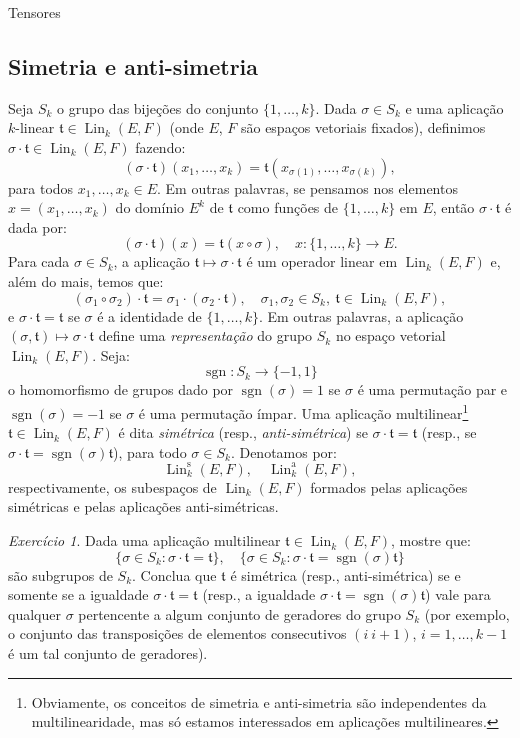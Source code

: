\documentclass[oneside,11pt]{amsart}
\DeclareMathOperator{\Lin}{Lin}
\DeclareMathOperator{\sgn}{sgn}
\theoremstyle{remark}\newtheorem{exercise}{Exercício}[section]
\theoremstyle{plain}\newtheorem{teo}{Teorema}[section]
\theoremstyle{plain}\newtheorem{lem}[teo]{Lema}
\theoremstyle{plain}\newtheorem{prop}[teo]{Proposição}
\theoremstyle{definition}\newtheorem{defin}[teo]{Definição}
\theoremstyle{remark}\newtheorem{rem}[teo]{Observação}
\theoremstyle{definition}\newtheorem{example}[teo]{Exemplo}
\numberwithin{equation}{section}
\begin{document}
\begin{section}{Tensores}
\subsection{Simetria e anti-simetria}\label{sub:tensorsimetria}
Seja $S_k$ o grupo das bijeções do conjunto $\{1,\ldots,k\}$. Dada $\sigma\in S_k$ e uma aplicação $k$-linear $\mathfrak t\in\Lin_k(E,F)$ (onde $E$, $F$
são espaços vetoriais fixados), definimos $\sigma\cdot\mathfrak t\in\Lin_k(E,F)$ fazendo:
\[(\sigma\cdot\mathfrak t)(x_1,\ldots,x_k)=\mathfrak t(x_{\sigma(1)},\ldots,x_{\sigma(k)}),\]
para todos $x_1,\ldots,x_k\in E$. Em outras palavras, se pensamos nos elementos $x=(x_1,\ldots,x_k)$ do domínio $E^k$ de $\mathfrak t$ como
funções de $\{1,\ldots,k\}$ em $E$, então $\sigma\cdot\mathfrak t$ é dada por:
\[(\sigma\cdot\mathfrak t)(x)=\mathfrak t(x\circ\sigma),\quad x:\{1,\ldots,k\}\to E.\]
Para cada $\sigma\in S_k$, a aplicação $\mathfrak t\mapsto\sigma\cdot\mathfrak t$ é um operador linear em $\Lin_k(E,F)$ e, além do mais, temos que:
\[(\sigma_1\circ\sigma_2)\cdot\mathfrak t=\sigma_1\cdot(\sigma_2\cdot\mathfrak t),\quad\sigma_1,\sigma_2\in S_k,\ \mathfrak t\in\Lin_k(E,F),\]
e $\sigma\cdot\mathfrak t=\mathfrak t$ se $\sigma$ é a identidade de $\{1,\ldots,k\}$. Em outras palavras, a aplicação
$(\sigma,\mathfrak t)\mapsto\sigma\cdot\mathfrak t$ define uma {\em representação\/} do grupo $S_k$ no espaço vetorial $\Lin_k(E,F)$.
Seja:
\[\sgn:S_k\longrightarrow\{-1,1\}\]
o homomorfismo de grupos dado por $\sgn(\sigma)=1$ se $\sigma$ é uma permutação par e $\sgn(\sigma)=-1$ se $\sigma$ é uma permutação ímpar.
Uma aplicação multilinear\footnote{%
Obviamente, os conceitos de simetria e anti-simetria são independentes da multilinearidade, mas só estamos interessados em aplicações multilineares.}
$\mathfrak t\in\Lin_k(E,F)$ é dita {\em simétrica\/} (resp., {\em anti-simétrica}) se $\sigma\cdot\mathfrak t=\mathfrak t$
(resp., se $\sigma\cdot\mathfrak t=\sgn(\sigma)\mathfrak t$), para todo $\sigma\in S_k$. Denotamos por:
\[\Lin^{\mathrm s}_k(E,F),\quad\Lin^{\mathrm a}_k(E,F),\]
respectivamente, os subespaços de $\Lin_k(E,F)$ formados pelas aplicações si\-mé\-tri\-cas e pelas aplicações anti-simétricas.

\begin{exercise}\label{exe:bastatrocas}
Dada uma aplicação multilinear $\mathfrak t\in\Lin_k(E,F)$, mostre que:
\[\big\{\sigma\in S_k:\sigma\cdot\mathfrak t=\mathfrak t\big\},\quad\big\{\sigma\in S_k:\sigma\cdot\mathfrak t=\sgn(\sigma)\mathfrak t\big\}\]
são subgrupos de $S_k$. Conclua que $\mathfrak t$ é simétrica (resp., anti-simétrica) se e somente se a igualdade $\sigma\cdot\mathfrak t=\mathfrak t$
(resp., a igualdade $\sigma\cdot\mathfrak t=\sgn(\sigma)\mathfrak t$) vale para qualquer $\sigma$ pertencente a algum conjunto de geradores do grupo
$S_k$ (por exemplo, o conjunto das transposições de elementos consecutivos $(i\ i+1)$, $i=1,\ldots,k-1$ é um tal conjunto de geradores).
\end{exercise}


\end{section}
\end{document}
